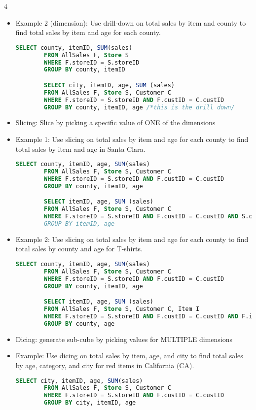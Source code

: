 \documentclass[8pt,landscape,a4paper, fleqn, dvipsnames]{extarticle}
\begin{document}
\begin{multicols*}{4}
\begin{itemize}
\begin{lstlisting}[language=SQL]
        SELECT city, itemID, age, SUM (sales)
        FROM AllSales F, Store S, Customer C
        WHERE F.storeID = S.storeID AND F.custID = C.custID
        GROUP BY city, itemID, age /*this is the drill down/
    \end{lstlisting}
    \item Example 2 (dimension): Use drill-down on total sales by item and county to find total sales by item and age for each county.
    \begin{lstlisting}[language=SQL]
        SELECT county, itemID, SUM(sales)
        FROM AllSales F, Store S
        WHERE F.storeID = S.storeID
        GROUP BY county, itemID

        SELECT city, itemID, age, SUM (sales)
        FROM AllSales F, Store S, Customer C
        WHERE F.storeID = S.storeID AND F.custID = C.custID
        GROUP BY county, itemID, age /*this is the drill down/
    \end{lstlisting}
    \item Slicing: Slice by picking a specific value of ONE of the dimensions
    \item Example 1: Use slicing on total sales by item and age for each county to find total sales by item and age in Santa Clara.
    \begin{lstlisting}[language=SQL]
        SELECT county, itemID, age, SUM(sales)
        FROM AllSales F, Store S, Customer C
        WHERE F.storeID = S.storeID AND F.custID = C.custID
        GROUP BY county, itemID, age

        SELECT itemID, age, SUM (sales)
        FROM AllSales F, Store S, Customer C
        WHERE F.storeID = S.storeID AND F.custID = C.custID AND S.county = "Santa Clara" /*this is the slicing/
        GROUP BY itemID, age
    \end{lstlisting}
    \item Example 2: Use slicing on total sales by item and age for each county to find total sales by county and age for T-shirts.
    \begin{lstlisting}[language=SQL]
        SELECT county, itemID, age, SUM(sales)
        FROM AllSales F, Store S, Customer C
        WHERE F.storeID = S.storeID AND F.custID = C.custID
        GROUP BY county, itemID, age

        SELECT itemID, age, SUM (sales)
        FROM AllSales F, Store S, Customer C, Item I
        WHERE F.storeID = S.storeID AND F.custID = C.custID AND F.itemID = I.itemID AND category = "Tshit" /*slicing*/
        GROUP BY county, age
    \end{lstlisting}
    \item Dicing: generate sub-cube by picking values for MULTIPLE dimensions
    \item Example: Use dicing on total sales by item, age, and city to find total sales by age, category, and city for red items in California (CA).
    \begin{lstlisting}[language=SQL]
        SELECT city, itemID, age, SUM(sales)
        FROM AllSales F, Store S, Customer C
        WHERE F.storeID = S.storeID AND F.custID = C.custID
        GROUP BY city, itemID, age


\end{lstlisting}
\end{itemize}
\end{multicols*}
\end{document}
